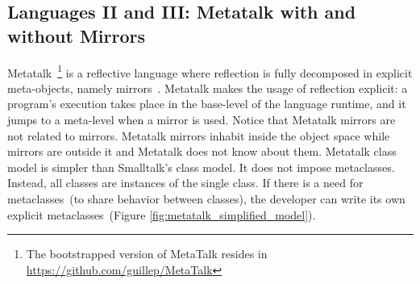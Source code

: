 


\subsection{Languages II and III: Metatalk with and without Mirrors} \label{sec:bootstrap_metatalk}

Metatalk~\cite{Papo11a}\footnote{The bootstrapped version of MetaTalk resides in \url{https://github.com/guillep/MetaTalk}} is a reflective language where reflection is fully decomposed in explicit meta-objects, namely mirrors~\cite{Brac04b}. Metatalk makes the usage of reflection explicit: a program's execution takes place in the base-level of the language runtime, and it jumps to a meta-level when a mirror is used. Notice that Metatalk mirrors are not related to \Vtt mirrors. Metatalk mirrors inhabit inside the object space while \Vtt mirrors are outside it and Metatalk does not know about them. Metatalk class model is simpler than Smalltalk's class model. It does not impose metaclasses. Instead, all classes are instances of the single  class. If there is a need for metaclasses~(to share behavior between classes), the developer can write its own explicit metaclasses~(Figure \ref{fig:metatalk_simplified_model}).

